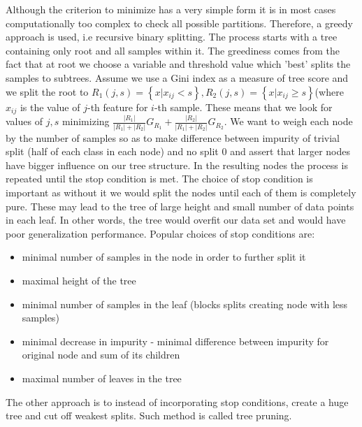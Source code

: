 \documentclass[shortabstract, english, mgr]{iithesis}
\begin{document}
Although the criterion to minimize has a very simple form it is in most cases computationally too complex to check all possible partitions. Therefore, a greedy approach is used, i.e recursive binary splitting. The process starts with a tree containing only root and all samples within it. The greediness comes from the fact that at root we choose a variable and threshold value which 'best' splits the samples to subtrees. Assume we use a Gini index as a measure of tree score and we split the root to $R_1(j, s) = \left\{x| x_{ij} < s \right\}, R_2(j, s) = \left\{x| x_{ij} \geq s \right\}$(where $x_{ij}$ is the value of $j$-th feature for $i$-th sample. These means that we look for values of $j,s$ minimizing $\frac{|R_1|}{|R_1|+|R_2|}G_{R_1} + \frac{|R_2|}{|R_1|+|R_2|}G_{R_2}$. We want to weigh each node by the number of samples so as to make difference between impurity of trivial split (half of each class in each node) and no split $0$ and assert that larger nodes have bigger influence on our tree structure. In the resulting nodes the process is repeated until the stop condition is met. The choice of stop condition is important as without it we would split the nodes until each of them is completely pure. These may lead to the tree of large height and small number of data points in each leaf. In other words, the tree would overfit our data set and would have poor generalization performance. Popular choices of stop conditions are:
\begin{itemize}
    \item minimal number of samples in the node in order to further split it
    \item maximal height of the tree
    \item minimal number of samples in the leaf (blocks splits creating node with less samples)
    \item minimal decrease in impurity - minimal difference between impurity for original node and sum of its children
    \item maximal number of leaves in the tree
\end{itemize}

The other approach is to instead of incorporating stop conditions, create a huge tree and cut off weakest splits. Such method is called tree pruning. 
\end{document}
